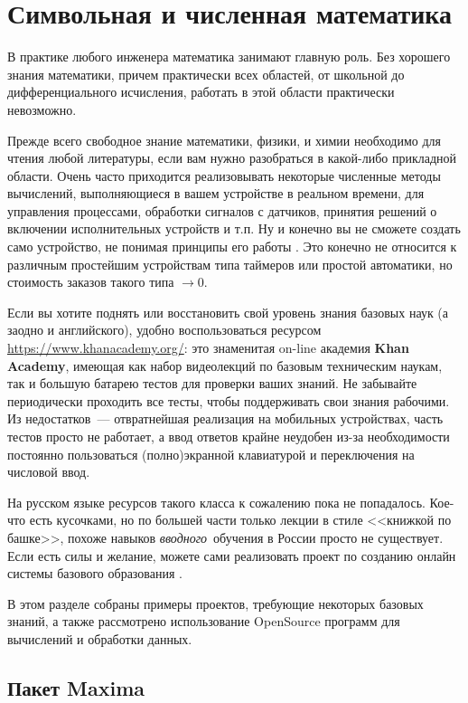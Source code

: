 \part{Символьная и численная математика}

В практике любого инженера математика занимают главную роль. Без хорошего знания
математики, причем практически всех областей, от школьной до дифференциального
исчисления, работать в этой области практически невозможно.

Прежде всего свободное знание математики, физики, и химии необходимо для чтения
любой литературы, если вам нужно разобраться в какой-либо прикладной области.
Очень часто приходится реализовывать некоторые численные методы вычислений,
выполняющиеся в вашем устройстве в реальном времени, для управления процессами,
обработки сигналов с датчиков, принятия решений о включении исполнительных
устройств и т.п. Ну и конечно вы не сможете создать само устройство, не понимая
принципы его работы \smiley. Это конечно не относится к различным простейшим
устройствам типа таймеров или простой автоматики, но стоимость заказов такого
типа $\rightarrow 0$.

Если вы хотите поднять или восстановить свой уровень знания базовых наук (а
заодно и английского), удобно воспользоваться ресурсом
\url{https://www.khanacademy.org/}: это знаменитая on-line академия \textbf{Khan
Academy}, имеющая как набор видеолекций по базовым техническим наукам, так и
большую батарею тестов для проверки ваших знаний. Не забывайте периодически
проходить все тесты, чтобы поддерживать свои знания рабочими. Из недостатков\
--- отвратнейшая реализация на мобильных устройствах, часть тестов просто не
работает, а ввод ответов крайне неудобен из-за необходимости постоянно
пользоваться (полно)экранной клавиатурой и переключения на числовой ввод.

На русском языке ресурсов такого класса к сожалению пока не попадалось.
Кое-что есть кусочками, но по большей части только лекции в стиле <<книжкой по
башке>>, похоже навыков \emph{вводного}\ обучения в России просто не существует.
Если есть силы и желание, можете сами реализовать проект по созданию онлайн
системы базового образования \smiley.

\bigskip
В этом разделе собраны примеры проектов, требующие некоторых базовых знаний, а
также рассмотрено использование OpenSource программ для вычислений и обработки
данных.
\clearpage

\chapter{Пакет Maxima}

